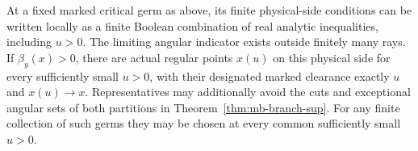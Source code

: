 \begin{lemma}
\label{pc:representatives}
At a fixed marked critical germ as above, its finite physical-side
conditions can be written locally as a finite Boolean combination
of real analytic inequalities, including $u>0$.
The limiting angular indicator exists outside finitely many rays.
If $\beta_y(x)>0$, there are actual regular points $x(u)$ on this
physical side for every sufficiently small $u>0$, with their
designated marked clearance exactly $u$ and $x(u)\to x$.
Representatives may additionally avoid the cuts and exceptional
angular sets of both partitions in Theorem~\ref{thm:mb-branch-sup}. For any finite
collection of such germs they may be chosen at every common
sufficiently small $u>0$.
\end{lemma}

